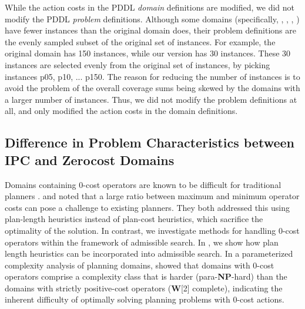 While the action costs in the PDDL \emph{domain} definitions are modified,
we did not modify the PDDL \emph{problem} definitions.
Although some domains (specifically, , , , ) have fewer instances than the original domain does,
their problem definitions are the evenly sampled subset of the original set of instances.
For example, the original  domain has 150 instances, while our version has 30 instances.
These 30 instances are selected evenly from the original set of instances, by picking instances p05, p10, ... p150.
% 
The reason for reducing the number of instances is to avoid the problem of the overall coverage sums being skewed by the domains with a larger number of instances.
Thus, we did not modify the problem definitions at all, and only modified the action costs in the domain definitions.

\subsection{Difference in Problem Characteristics between IPC and Zerocost Domains}

Domains containing 0-cost operators are known to be difficult for traditional planners \cite{thayer2009using,cushing2010cost,wilt2011cost,thayer2011bounded,richter2011lama}.
\citeauthor{cushing2010cost} \citeyear{cushing2010cost} and \citeauthor{wilt2011cost} \citeyear{wilt2011cost} noted that a large ratio between maximum and minimum operator costs can pose a challenge to existing planners. They both addressed this using plan-length heuristics instead of plan-cost heuristics, which sacrifice the optimality of the solution. In contrast, we investigate methods for handling 0-cost operators within the framework of admissible search. In , we show how  plan length heuristics can be incorporated into admissible search.
In a parameterized complexity analysis of planning domains,
\citeauthor{aghighi2015} \citeyear{aghighi2015,aghighi2016} %
showed %
that domains with 0-cost operators comprise a complexity class that is harder (para-\textbf{NP}-hard) than the domains with strictly positive-cost operators (\textbf{W}[2] complete), 
indicating the inherent difficulty of optimally solving planning problems with 0-cost actions.

